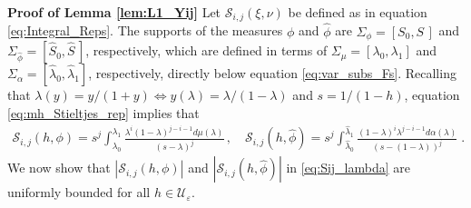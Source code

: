 \documentclass[english,12pt,jmp,graphicx]{revtex4-1}
\newcommand{\ph}{\hat{\phi}}
\begin{document}
\noindent\textbf{Proof of Lemma \ref{lem:L1_Yij} }
Let $\mathcal{S}_{i,j}(\xi,\nu)$ be defined as in equation
\eqref{eq:Integral_Reps}. The supports of the measures $\phi$ and $\ph$
are $\Sigma_\phi=[S_0,S\,]$ and $\Sigma_{\ph}=[\hat{S}_0,\hat{S}\,]$, respectively,
which are defined in terms of $\Sigma_\mu=[\lambda_0,\lambda_1]$ and
$\Sigma_\alpha=[\hat{\lambda}_0,\hat{\lambda}_1]$, respectively, directly below equation
\eqref{eq:var_subs_Fs}. Recalling that $\lambda(y)=y/(1+y)\iff y(\lambda)=\lambda/(1-\lambda)$
and $s=1/(1-h)$, equation \eqref{eq:mh_Stieltjes_rep} implies that
%
\begin{align}\label{eq:Sij_lambda}
  \mathcal{S}_{i,j}(h,\phi)%
      =s^j\int_{\lambda_0}^{\lambda_1}\frac{\lambda^i(1-\lambda)^{j-i-1}d\mu(\lambda)}{(s-\lambda)^j}\,, \quad
\mathcal{S}_{i,j}(h,\ph)=s^j\int_{\hat{\lambda}_0}^{\hat{\lambda}_1}\frac{(1-\lambda)^i\lambda^{j-i-1}d\alpha(\lambda)}{(s-(1-\lambda))^j}\;.    
\end{align}
%
%
We now show that $|\mathcal{S}_{i,j}(h,\phi)|$ and
$|\mathcal{S}_{i,j}(h,\ph)|$ in \eqref{eq:Sij_lambda} are uniformly
bounded for all $h\in\mathcal{U}_\varepsilon$.
\end{document}

